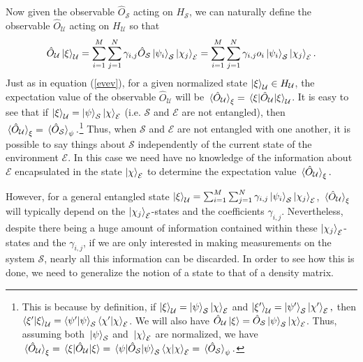      Now given the observable $\hat{O}_{\mathcal{S}}$ acting on $H_\mathcal{S}$, we can  naturally define the observable $\hat{O}_\mathcal{U}$ acting on $H_\mathcal{U}$ so that 
    \begin{equation}\label{extension}\hat{O}_\mathcal{U}\ket{\xi}_\mathcal{U}=\sum_{i=1}^M\sum_{j=1}^N\gamma_{i,j}\hat{O}_\mathcal{S}\ket{\psi_i}_\mathcal{S}\ket{\chi_j}_\mathcal{E}=\sum_{i=1}^M\sum_{j=1}^N\gamma_{i,j}o_i\ket{\psi_i}_\mathcal{S}\ket{\chi_j}_\mathcal{E}.
    \end{equation}Just   %
%
    as in equation (\ref{evev}), for a given normalized state $\ket{\xi}_\mathcal{U}\in H_\mathcal{U}$, the expectation value of the observable $\hat{O}_\mathcal{U}$ will be $\ev*{\hat{O}_\mathcal{U}}_\xi=\ev*{\hat{O}_\mathcal{U}}{\xi}_\mathcal{U}$. It is easy to see that if $\ket{\xi}_\mathcal{U}=\ket{\psi}_\mathcal{S}\ket{\chi}_\mathcal{E}$ (i.e. $\mathcal{S}$ and $\mathcal{E}$ are not entangled), then $\ev*{\hat{O}_\mathcal{U}}_\xi=\ev*{\hat{O}_\mathcal{S}}_\psi.$\footnote{\label{untangledobservable}This is because by definition, if $\ket{\xi}_\mathcal{U}=\ket{\psi}_\mathcal{S}\ket{\chi}_\mathcal{E}$ and $\ket{\xi'}_\mathcal{U}=\ket{\psi'}_\mathcal{S}\ket{\chi'}_\mathcal{E},$ then $\ip{\xi'}{\xi}_\mathcal{U}=\ip{\psi'}{\psi}_\mathcal{S}\ip{\chi'}{\chi}_\mathcal{E}$. We will also have $\hat{O}_\mathcal{U}\ket{\xi}=\hat{O}_\mathcal{S}\ket{\psi}_\mathcal{S}\ket{\chi}_\mathcal{E}$. Thus, assuming both $\ket*{\psi}_\mathcal{S}$ and $\ket*{\chi}_\mathcal{E}$ are normalized, we have $\ev*{\hat{O}_\mathcal{U}}_\xi=\ev*{\hat{O}_\mathcal{U}}{\xi}=\ev*{\hat{O}_\mathcal{S}}{\psi}_\mathcal{S}\ip{\chi}{\chi}_\mathcal{E}=\ev*{\hat{O}_\mathcal{S}}_\psi.$ } Thus, when $\mathcal{S}$ and $\mathcal{E}$ are not entangled with one another, it is possible to say things about $\mathcal{S}$ independently of the current state of the environment  $\mathcal{E}$. In this case we need have no knowledge of the information about $\mathcal{E}$ encapsulated in the state $\ket{\chi}_\mathcal{E}$ to determine the expectation value $\ev*{\hat{O}_\mathcal{U}}_\xi. $
    
    However, for a general entangled state $\ket{\xi}_\mathcal{U}=\sum_{i=1}^M\sum_{j=1}^N\gamma_{i,j}\ket{\psi_i}_\mathcal{S}\ket{\chi_j}_\mathcal{E}$,  $\ev*{\hat{O}_\mathcal{U}}_\xi $ will typically depend on the $\ket{\chi_j}_\mathcal{E}$-states and the coefficients $\gamma_{i,j}$. Nevertheless, despite there being a huge amount of information contained within these $\ket{\chi_j}_\mathcal{E}$-states and the  $\gamma_{i,j}$, if we are only interested in making measurements on the system $\mathcal{S}$, nearly all this information can be discarded. In order to see how this is done, we need to generalize the notion of a state to that of a density matrix. 

